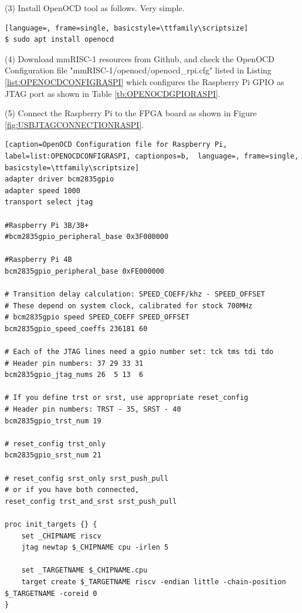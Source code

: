 (3) Install OpenOCD tool as follows. Very simple.

\begin{lstlisting}[language=, frame=single, basicstyle=\ttfamily\scriptsize]
$ sudo apt install openocd
\end{lstlisting}

(4) Download mmRISC-1 resources from Github, and check the OpenOCD Configuration file "mmRISC-1/openocd/openocd\_rpi.cfg" listed in Listing \ref{list:OPENOCDCONFIGRASPI} which configures the Raspberry Pi GPIO as JTAG port as shown in Table \ref{tb:OPENOCDGPIORASPI}. 

(5) Connect the Raspberry Pi to the FPGA board as shown in Figure \ref{fig:USBJTAGCONNECTIONRASPI}.

\begin{lstlisting}[caption=OpenOCD Configuration file for Raspberry Pi, label=list:OPENOCDCONFIGRASPI, captionpos=b,  language=, frame=single, basicstyle=\ttfamily\scriptsize]
adapter driver bcm2835gpio
adapter speed 1000
transport select jtag

#Raspberry Pi 3B/3B+
#bcm2835gpio_peripheral_base 0x3F000000

#Raspberry Pi 4B
bcm2835gpio_peripheral_base 0xFE000000

# Transition delay calculation: SPEED_COEFF/khz - SPEED_OFFSET
# These depend on system clock, calibrated for stock 700MHz
# bcm2835gpio speed SPEED_COEFF SPEED_OFFSET
bcm2835gpio_speed_coeffs 236181 60

# Each of the JTAG lines need a gpio number set: tck tms tdi tdo
# Header pin numbers: 37 29 33 31
bcm2835gpio_jtag_nums 26  5 13  6

# If you define trst or srst, use appropriate reset_config
# Header pin numbers: TRST - 35, SRST - 40
bcm2835gpio_trst_num 19

# reset_config trst_only
bcm2835gpio_srst_num 21

# reset_config srst_only srst_push_pull
# or if you have both connected,
reset_config trst_and_srst srst_push_pull

proc init_targets {} {
    set _CHIPNAME riscv
    jtag newtap $_CHIPNAME cpu -irlen 5

    set _TARGETNAME $_CHIPNAME.cpu
    target create $_TARGETNAME riscv -endian little -chain-position $_TARGETNAME -coreid 0
}
\end{lstlisting}

